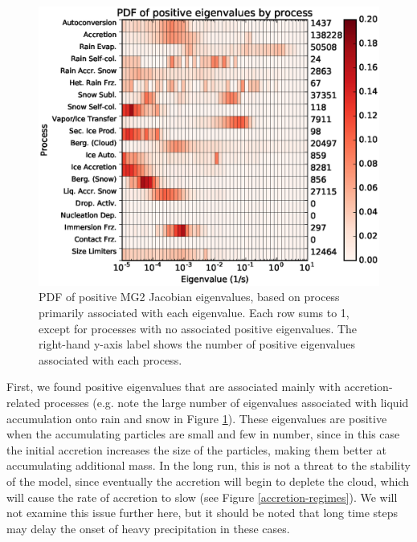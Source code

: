 \documentclass [11pt, proquest] {uwthesis}[2020/02/24]
\begin{document}
\begin{figure}[htbp]
  \includegraphics[width=6.5in]{./time_hist_process_2D_pos.eps}
  \caption[PDF of positive eigenvalues of the Jacobian of MG2, separated by process]{PDF of positive MG2 Jacobian eigenvalues, based on process primarily associated with each eigenvalue. Each row sums to \num{1}, except for processes with no associated positive eigenvalues. The right-hand y-axis label shows the number of positive eigenvalues associated with each process.}
  \label{process-2D-pos-eig}
\end{figure}

First, we found positive eigenvalues that are associated mainly with accretion-related processes (e.g. note the large number of eigenvalues associated with liquid accumulation onto rain and snow in Figure \ref{process-2D-pos-eig}). These eigenvalues are positive when the accumulating particles are small and few in number, since in this case the initial accretion increases the size of the particles, making them better at accumulating additional mass. In the long run, this is not a threat to the stability of the model, since eventually the accretion will begin to deplete the cloud, which will cause the rate of accretion to slow (see Figure \ref{accretion-regimes}). We will not examine this issue further here, but it should be noted that long time steps may delay the onset of heavy precipitation in these cases.
\end{document}
